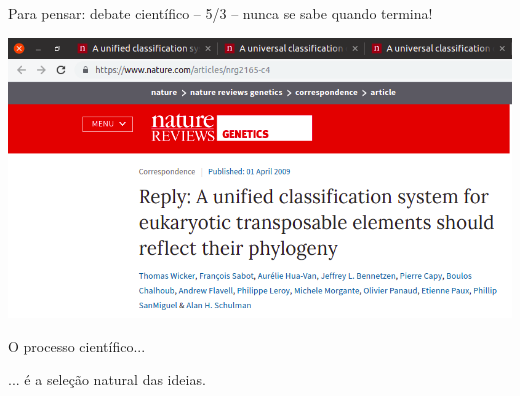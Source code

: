 \documentclass{beamer}
\begin{document}
\begin{frame}{\tiny Para pensar: debate científico -- 5/3 -- nunca se sabe quando termina!}
  \begin{center}
    \includegraphics[width=\textwidth]{Encerramento/polemica5}
  \end{center}
\end{frame}

\begin{frame}
  \begin{center}
    O processo científico...

    \bigskip
    \bigskip
    ... é a seleção natural das ideias.
  \end{center}
\end{frame}
\end{document}
